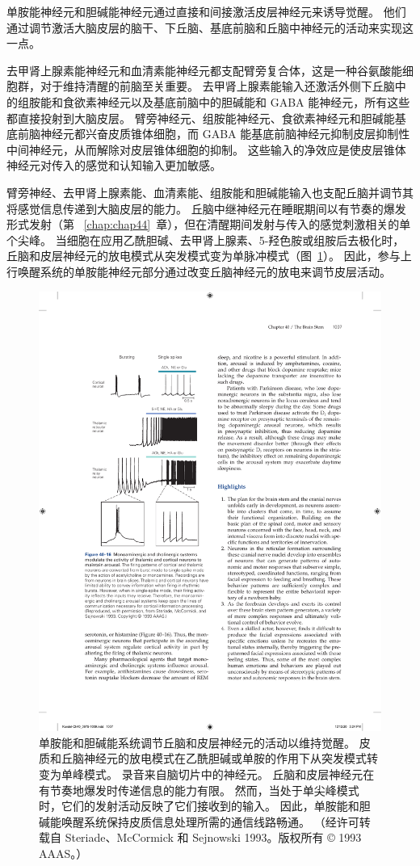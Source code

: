 单胺能神经元和胆碱能神经元通过直接和间接激活皮层神经元来诱导觉醒。
他们通过调节激活大脑皮层的脑干、下丘脑、基底前脑和丘脑中神经元的活动来实现这一点。


去甲肾上腺素能神经元和血清素能神经元都支配臂旁复合体，这是一种谷氨酸能细胞群，对于维持清醒的前脑至关重要。
去甲肾上腺素能输入还激活外侧下丘脑中的组胺能和食欲素神经元以及基底前脑中的胆碱能和 GABA 能神经元，所有这些都直接投射到大脑皮层。
臂旁神经元、组胺能神经元、食欲素神经元和胆碱能基底前脑神经元都兴奋皮质锥体细胞，而 GABA 能基底前脑神经元抑制皮层抑制性中间神经元，从而解除对皮层锥体细胞的抑制。
这些输入的净效应是使皮层锥体神经元对传入的感觉和认知输入更加敏感。


臂旁神经、去甲肾上腺素能、血清素能、组胺能和胆碱能输入也支配丘脑并调节其将感觉信息传递到大脑皮层的能力。
丘脑中继神经元在睡眠期间以有节奏的爆发形式发射（第 ~\ref{chap:chap44}~章），但在清醒期间发射与传入的感觉刺激相关的单个尖峰。
当细胞在应用乙酰胆碱、去甲肾上腺素、5-羟色胺或组胺后去极化时，丘脑和皮层神经元的放电模式从突发模式变为单脉冲模式（图~\ref{fig:40_16}）。
因此，参与上行唤醒系统的单胺能神经元部分通过改变丘脑神经元的放电来调节皮层活动。


\begin{figure}[htbp]
	\centering
	\includegraphics[width=0.45\linewidth]{chap40/fig_40_16}
	\caption{单胺能和胆碱能系统调节丘脑和皮层神经元的活动以维持觉醒。 皮质和丘脑神经元的放电模式在乙酰胆碱或单胺的作用下从突发模式转变为单峰模式。 录音来自脑切片中的神经元。 丘脑和皮层神经元在有节奏地爆发时传递信息的能力有限。 然而，当处于单尖峰模式时，它们的发射活动反映了它们接收到的输入。 因此，单胺能和胆碱能唤醒系统保持皮质信息处理所需的通信线路畅通。 （经许可转载自 Steriade、McCormick 和 Sejnowski 1993。版权所有 © 1993 AAAS。）}
	\label{fig:40_16}
\end{figure}


